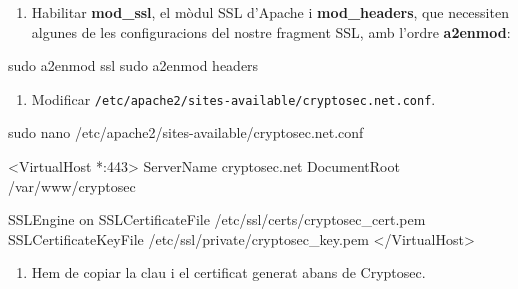 \documentclass[]{article}
\newenvironment{Shaded}{}{}
\newcommand{\ExtensionTok}[1]{#1}
\newcommand{\FunctionTok}[1]{\textcolor[rgb]{0.02,0.16,0.49}{#1}}
\newcommand{\NormalTok}[1]{#1}
\newcommand{\OperatorTok}[1]{\textcolor[rgb]{0.40,0.40,0.40}{#1}}
\providecommand{\tightlist}{%
  \setlength{\itemsep}{0pt}\setlength{\parskip}{0pt}}
\begin{document}
\begin{enumerate}
\def\labelenumi{\arabic{enumi}.}
\tightlist
\item
  Habilitar \textbf{mod\_ssl}, el mòdul SSL d'Apache i
  \textbf{mod\_headers}, que necessiten algunes de les configuracions
  del nostre fragment SSL, amb l'ordre \textbf{a2enmod}:
\end{enumerate}

\begin{Shaded}
\begin{Highlighting}[]
\FunctionTok{sudo}\NormalTok{ a2enmod ssl}
\FunctionTok{sudo}\NormalTok{ a2enmod headers}
\end{Highlighting}
\end{Shaded}

\begin{enumerate}
\def\labelenumi{\arabic{enumi}.}
\setcounter{enumi}{1}
\tightlist
\item
  Modificar \texttt{/etc/apache2/sites-available/cryptosec.net.conf}.
\end{enumerate}

\begin{Shaded}
\begin{Highlighting}[]
\FunctionTok{sudo}\NormalTok{ nano /etc/apache2/sites-available/cryptosec.net.conf}
\end{Highlighting}
\end{Shaded}

\begin{Shaded}
\begin{Highlighting}[]
\OperatorTok{<}\ExtensionTok{VirtualHost}\NormalTok{ *:}\OperatorTok{443>}
   \ExtensionTok{ServerName}\NormalTok{ cryptosec.net}
   \ExtensionTok{DocumentRoot}\NormalTok{ /var/www/cryptosec}

   \ExtensionTok{SSLEngine}\NormalTok{ on}
   \ExtensionTok{SSLCertificateFile}\NormalTok{ /etc/ssl/certs/cryptosec_cert.pem}
   \ExtensionTok{SSLCertificateKeyFile}\NormalTok{ /etc/ssl/private/cryptosec_key.pem}
\OperatorTok{<}\NormalTok{/}\ExtensionTok{VirtualHost}\OperatorTok{>}
\end{Highlighting}
\end{Shaded}

\begin{enumerate}
\def\labelenumi{\arabic{enumi}.}
\setcounter{enumi}{2}
\tightlist
\item
  Hem de copiar la clau i el certificat generat abans de Cryptosec.
\end{enumerate}
\end{document}
